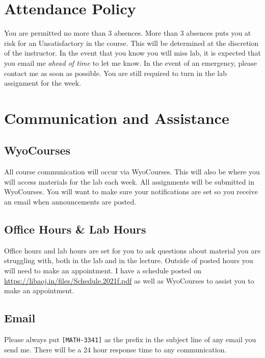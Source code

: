 \documentclass[11pt, letterpaper]{article}
\begin{document}
\section*{Attendance Policy}
You are permitted no more than 3 absences. More than 3 absences puts you at risk for an Unsatisfactory in the course. This will be determined at the discretion of the instructor. In the event that you know you will miss lab, it is expected that you email me \emph{ahead of time} to let me know. In the event of an emergency, please contact me as soon as possible. You are still required to turn in the lab assignment for the week.

\section*{Communication and Assistance}
\subsection*{WyoCourses}
All course communication will occur via WyoCourses. This will also be where you will access materials for the lab each week. All assignments will be submitted in WyoCourses. You will want to make sure your notifications are set so you receive an email when announcements are posted.

\subsection*{Office Hours \& Lab Hours}
Office hours and lab hours are set for you to ask questions about material you are struggling with, both in the lab and in the lecture. Outside of posted hours you will need to make an appointment. I have a schedule posted on \url{https://libaoj.in/files/Schedule.2021f.pdf} as well as WyoCourses to assist you to make an appointment.
\subsection*{Email}
Please always put \texttt{[MATH-3341]} as the prefix in the subject line of any email you send me. There will be a 24 hour response time to any communication.
\end{document}
